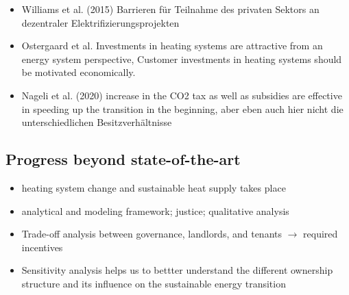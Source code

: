\begin{itemize}
	\item Williams et al. (2015) \cite{williams2015enabling} Barrieren für Teilnahme des privaten Sektors an dezentraler Elektrifizierungsprojekten
	\item Ostergaard et al. \cite{ostergaard2019costs} Investments in heating systems are attractive from an energy system perspective, Customer investments in heating systems should be motivated economically.
	\item Nageli et al. (2020) \cite{nageli2020policies} increase in the CO2 tax as well as subsidies are effective in speeding up the transition in the beginning, aber eben auch hier nicht die unterschiedlichen Besitzverhältnisse 
\end{itemize}

\subsection{Progress beyond state-of-the-art}
\begin{itemize}
	\item heating system change and sustainable heat supply takes place
	\item analytical and modeling framework; justice; qualitative analysis
	\item Trade-off analysis between governance, landlords, and tenants $\longrightarrow$ required incentives
	\item Sensitivity analysis helps us to bettter understand the different ownership structure and its influence on the sustainable energy transition
\end{itemize}